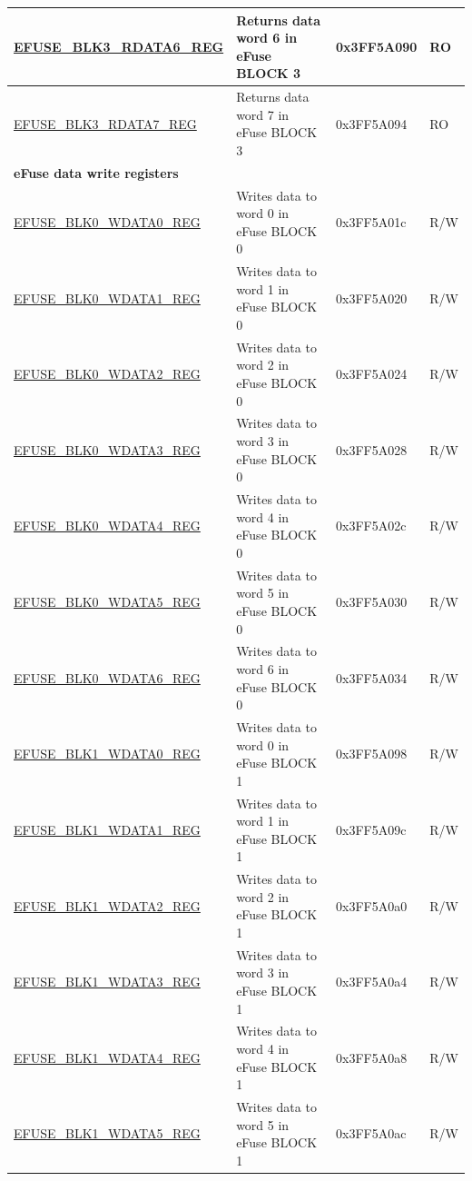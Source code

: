 \begin{longtable}{ | p{5cm} | p{7.5cm} | p{2cm} | p{1cm} | }
\hyperref[regdesc:EFUSEBLK3RDATAnREG]{EFUSE\_BLK3\_RDATA6\_REG} & Returns data word 6 in eFuse BLOCK 3 & 0x3FF5A090 & RO \\ \hline
\hyperref[regdesc:EFUSEBLK3RDATAnREG]{EFUSE\_BLK3\_RDATA7\_REG} & Returns data word 7 in eFuse BLOCK 3 & 0x3FF5A094 & RO \\ \hline
\multicolumn{4}{|l|}{\textbf{eFuse data write registers}} \\ \hline
\hyperref[regdesc:EFUSEBLK0WDATA0REG]{EFUSE\_BLK0\_WDATA0\_REG} & Writes data to word 0 in eFuse BLOCK 0 & 0x3FF5A01c & R/W \\ \hline
\hyperref[regdesc:EFUSEBLK0WDATA1REG]{EFUSE\_BLK0\_WDATA1\_REG} & Writes data to word 1 in eFuse BLOCK 0 & 0x3FF5A020 & R/W \\ \hline
\hyperref[regdesc:EFUSEBLK0WDATA2REG]{EFUSE\_BLK0\_WDATA2\_REG} & Writes data to word 2 in eFuse BLOCK 0 & 0x3FF5A024 & R/W \\ \hline
\hyperref[regdesc:EFUSEBLK0WDATA3REG]{EFUSE\_BLK0\_WDATA3\_REG} & Writes data to word 3 in eFuse BLOCK 0 & 0x3FF5A028 & R/W \\ \hline
\hyperref[regdesc:EFUSEBLK0WDATA4REG]{EFUSE\_BLK0\_WDATA4\_REG} & Writes data to word 4 in eFuse BLOCK 0 & 0x3FF5A02c & R/W \\ \hline
\hyperref[regdesc:EFUSEBLK0WDATA5REG]{EFUSE\_BLK0\_WDATA5\_REG} & Writes data to word 5 in eFuse BLOCK 0 & 0x3FF5A030 & R/W \\ \hline
\hyperref[regdesc:EFUSEBLK0WDATA6REG]{EFUSE\_BLK0\_WDATA6\_REG} & Writes data to word 6 in eFuse BLOCK 0 & 0x3FF5A034 & R/W \\ \hline
\hyperref[regdesc:EFUSEBLK1WDATAnREG]{EFUSE\_BLK1\_WDATA0\_REG} & Writes data to word 0 in eFuse BLOCK 1 & 0x3FF5A098 & R/W \\ \hline
\hyperref[regdesc:EFUSEBLK1WDATAnREG]{EFUSE\_BLK1\_WDATA1\_REG} & Writes data to word 1 in eFuse BLOCK 1 & 0x3FF5A09c & R/W \\ \hline
\hyperref[regdesc:EFUSEBLK1WDATAnREG]{EFUSE\_BLK1\_WDATA2\_REG} & Writes data to word 2 in eFuse BLOCK 1 & 0x3FF5A0a0 & R/W \\ \hline
\hyperref[regdesc:EFUSEBLK1WDATAnREG]{EFUSE\_BLK1\_WDATA3\_REG} & Writes data to word 3 in eFuse BLOCK 1 & 0x3FF5A0a4 & R/W \\ \hline
\hyperref[regdesc:EFUSEBLK1WDATAnREG]{EFUSE\_BLK1\_WDATA4\_REG} & Writes data to word 4 in eFuse BLOCK 1 & 0x3FF5A0a8 & R/W \\ \hline
\hyperref[regdesc:EFUSEBLK1WDATAnREG]{EFUSE\_BLK1\_WDATA5\_REG} & Writes data to word 5 in eFuse BLOCK 1 & 0x3FF5A0ac & R/W \\ \hline

\end{longtable}
